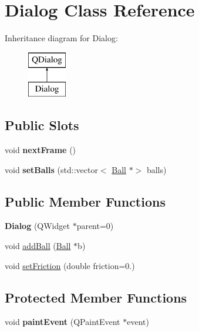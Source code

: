 \hypertarget{class_dialog}{}\section{Dialog Class Reference}
\label{class_dialog}
Inheritance diagram for Dialog\+:\begin{figure}[H]
\begin{center}
\leavevmode
\includegraphics[height=2.000000cm]{class_dialog}
\end{center}
\end{figure}
\subsection*{Public Slots}
\begin{DoxyCompactItemize}
\item 
\mbox{\label{class_dialog_a8bc4fe3b0cc12033369b49eab8751e14}} 
void {\bfseries next\+Frame} ()
\item 
\mbox{\label{class_dialog_a7760d4357317544538ea9815af13c4c7}} 
void {\bfseries set\+Balls} (std\+::vector$<$ \mbox{\hyperlink{class_ball}{Ball}} $\ast$$>$ balls)
\end{DoxyCompactItemize}
\subsection*{Public Member Functions}
\begin{DoxyCompactItemize}
\item 
\mbox{\label{class_dialog_acfa2063f9f962d394c6a645b6e7e08d8}} 
{\bfseries Dialog} (Q\+Widget $\ast$parent=0)
\item 
void \mbox{\hyperlink{class_dialog_a4be1977cc02114a71dd2d43e7e27b6ff}{add\+Ball}} (\mbox{\hyperlink{class_ball}{Ball}} $\ast$b)
\item 
void \mbox{\hyperlink{class_dialog_a072907acf851676f20f018ee27766ab9}{set\+Friction}} (double friction=0.)
\end{DoxyCompactItemize}
\subsection*{Protected Member Functions}
\begin{DoxyCompactItemize}
\item 
\mbox{\label{class_dialog_ac761f05fce616d76acf0612370b857ad}} 
void {\bfseries paint\+Event} (Q\+Paint\+Event $\ast$event)
\end{DoxyCompactItemize}


